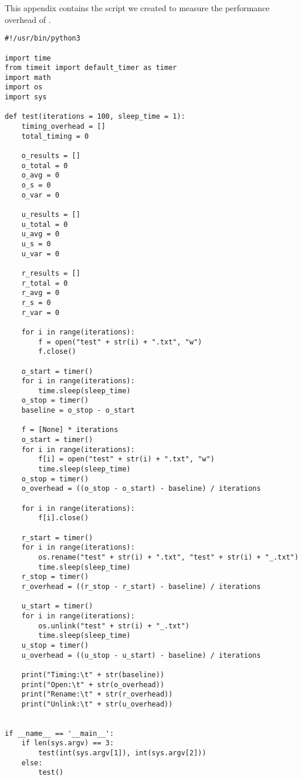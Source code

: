 \label{app:B}


\selectfont
This appendix contains the script we created to measure the performance overhead of .
\selectfont
\begin{lstlisting}[style=CStyle]
#!/usr/bin/python3

import time
from timeit import default_timer as timer
import math
import os
import sys

def test(iterations = 100, sleep_time = 1):
	timing_overhead = []
	total_timing = 0

	o_results = []
	o_total = 0
	o_avg = 0
	o_s = 0
	o_var = 0

	u_results = []
	u_total = 0
	u_avg = 0
	u_s = 0
	u_var = 0

	r_results = []
	r_total = 0
	r_avg = 0
	r_s = 0
	r_var = 0

    for i in range(iterations):
		f = open("test" + str(i) + ".txt", "w")
		f.close()

    o_start = timer()
	for i in range(iterations):
		time.sleep(sleep_time)
	o_stop = timer()
	baseline = o_stop - o_start

    f = [None] * iterations
	o_start = timer()
	for i in range(iterations):
		f[i] = open("test" + str(i) + ".txt", "w")
		time.sleep(sleep_time)
	o_stop = timer()
	o_overhead = ((o_stop - o_start) - baseline) / iterations

    for i in range(iterations):
		f[i].close()

    r_start = timer()
	for i in range(iterations):
		os.rename("test" + str(i) + ".txt", "test" + str(i) + "_.txt")
		time.sleep(sleep_time)
	r_stop = timer()
	r_overhead = ((r_stop - r_start) - baseline) / iterations

   	u_start = timer()
	for i in range(iterations):
		os.unlink("test" + str(i) + "_.txt")
		time.sleep(sleep_time)
	u_stop = timer()
	u_overhead = ((u_stop - u_start) - baseline) / iterations

    print("Timing:\t" + str(baseline))
	print("Open:\t" + str(o_overhead))
	print("Rename:\t" + str(r_overhead))
	print("Unlink:\t" + str(u_overhead))


if __name__ == '__main__':
	if len(sys.argv) == 3:
		test(int(sys.argv[1]), int(sys.argv[2]))
	else:
		test()

\end{lstlisting}

